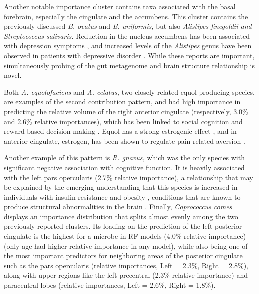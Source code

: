 \documentclass[a4paper]{article}
\begin{document}
Another notable importance cluster contains taxa associated with the
basal forebrain, especially the cingulate and the accumbens. This
cluster contains the previously-discussed \emph{B. ovatus} and \emph{B.
uniformis,} but also \emph{Alistipes finegoldii and Streptococcus
salivaris.} Reduction in the nucleus accumbens has been associated with
depression symptoms
\citep{wackerRoleNucleusAccumbens2009},
and increased levels of the \emph{Alistipes} genus have been
observed in patients with depressive disorder
\citep{jiangAlteredFecalMicrobiota2015}.
While these reports are important, simultaneously probing of the gut
metagenome and brain structure relationship is novel.

Both \emph{A. equolofaciens} and \emph{A. celatus,} two closely-related
equol-producing species, are examples of the second contribution
pattern, and had high importance in predicting the relative volume of
the right anterior cingulate (respectively, 3.0\% and 2.6\% relative
importances), which has been linked to social cognition and reward-based
decision making
\citep{appsAnteriorCingulateGyrus2016,boesRightAnteriorCingulate2008,bushDorsalAnteriorCingulate2002}.
Equol has a strong estrogenic effect
\citep{setchellSEquolPotentLigand2005},
and in anterior cingulate, estrogen, has been shown to regulate
pain-related aversion
\citep{xiaoEstrogenAnteriorCingulate2013}.

Another example of this pattern is \emph{R. gnavus,} which was the only
species with significant negative association with cognitive function.
It is heavily associated with the left pars opercularis (2.7\% relative
importance), a relationship that may be explained by the emerging
understanding that this species is increased in individuals with insulin
resistance and obesity \citep{leyHumanGutMicrobes2006},
conditions that are known to produce structural abnormalities in the brain
\citep{opelBrainStructuralAbnormalities2021}.
Finally, \emph{Coprococcus comes} displays an importance
distribution that splits almost evenly among the two previously reported
clusters. Its loading on the prediction of the left posterior cingulate
is the highest for a microbe in RF models (4.0\% relative importance)
(only age had higher relative importance in any model), while also being
one of the most important predictors for neighboring areas of the
posterior cingulate such as the pars opercularis (relative importances,
Left = 2.3\%, Right = 2.8\%), along with upper regions like the left
precentral (2.3\% relative importance) and paracentral lobes (relative
importances, Left = 2.6\%, Right = 1.8\%).
\end{document}
